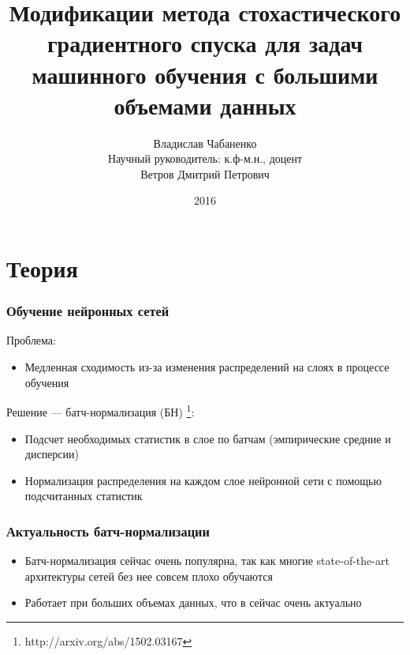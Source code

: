 \documentclass{beamer}
\title{Модификации метода стохастического градиентного спуска для задач машинного обучения с большими объемами данных}
\author[Chabanenko]{Владислав Чабаненко\\[5mm]Научный руководитель: к.ф-м.н., доцент \\Ветров Дмитрий Петрович}
\institute[ВМК МГУ имени М.В. Ломоносова]
{
\medskip
}
\date{2016}
\begin{document}
\begin{frame}
	\titlepage
\end{frame}

\section{Теория}

\begin{frame}
	\frametitle{Обучение нейронных сетей}
Проблема:
\begin{itemize}
\item Медленная сходимость из-за изменения распределений на слоях в процессе обучения
\end{itemize}	
	
Решение --- батч-нормализация (БН) \footnote{http://arxiv.org/abs/1502.03167}:
\begin{itemize}
\item Подсчет необходимых статистик в слое по батчам (эмпирические средние и дисперсии) %
\item Нормализация распределения на каждом слое нейронной сети с помощью подсчитанных статистик %
\end{itemize}
	
\end{frame}

	

\begin{frame}
\frametitle{Актуальность батч-нормализации}

\begin{itemize}
\item Батч-нормализация сейчас очень популярна, так как многие state-of-the-art архитектуры сетей без нее совсем плохо обучаются
\item Работает при больших объемах данных, что в сейчас очень актуально
\end{itemize}
\end{frame}
	
\end{document}
